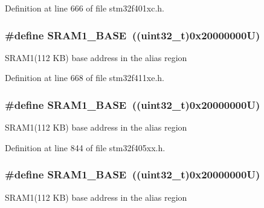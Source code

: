 Definition at line 666 of file stm32f401xc.\+h.

\subsubsection[{\texorpdfstring{S\+R\+A\+M1\+\_\+\+B\+A\+SE}{SRAM1_BASE}}]{\setlength{\rightskip}{0pt plus 5cm}\#define S\+R\+A\+M1\+\_\+\+B\+A\+SE~((uint32\+\_\+t)0x20000000\+U)}\hypertarget{group___peripheral__registers__structures_ga7d0fbfb8894012dbbb96754b95e562cd}{}\label{group___peripheral__registers__structures_ga7d0fbfb8894012dbbb96754b95e562cd}
S\+R\+A\+M1(112 K\+B) base address in the alias region 

Definition at line 668 of file stm32f411xe.\+h.

\subsubsection[{\texorpdfstring{S\+R\+A\+M1\+\_\+\+B\+A\+SE}{SRAM1_BASE}}]{\setlength{\rightskip}{0pt plus 5cm}\#define S\+R\+A\+M1\+\_\+\+B\+A\+SE~((uint32\+\_\+t)0x20000000\+U)}\hypertarget{group___peripheral__registers__structures_ga7d0fbfb8894012dbbb96754b95e562cd}{}\label{group___peripheral__registers__structures_ga7d0fbfb8894012dbbb96754b95e562cd}
S\+R\+A\+M1(112 K\+B) base address in the alias region 

Definition at line 844 of file stm32f405xx.\+h.

\subsubsection[{\texorpdfstring{S\+R\+A\+M1\+\_\+\+B\+A\+SE}{SRAM1_BASE}}]{\setlength{\rightskip}{0pt plus 5cm}\#define S\+R\+A\+M1\+\_\+\+B\+A\+SE~((uint32\+\_\+t)0x20000000\+U)}\hypertarget{group___peripheral__registers__structures_ga7d0fbfb8894012dbbb96754b95e562cd}{}\label{group___peripheral__registers__structures_ga7d0fbfb8894012dbbb96754b95e562cd}
S\+R\+A\+M1(112 K\+B) base address in the alias region 

